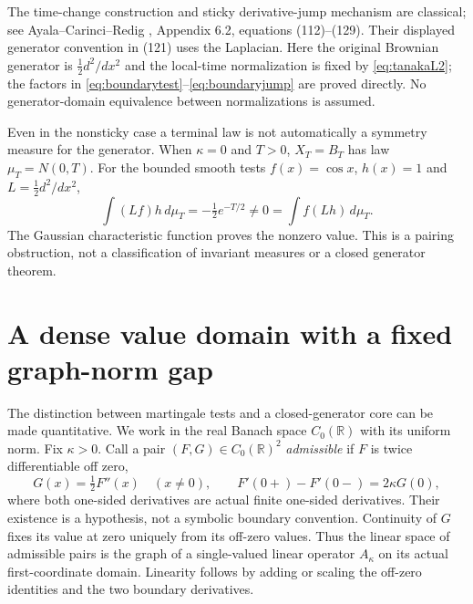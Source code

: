 \documentclass[11pt]{article}
\newcommand{\R}{\mathbb R}
\begin{document}
The time-change construction and sticky derivative-jump mechanism
are classical; see Ayala--Carinci--Redig \cite{ACR}, Appendix 6.2,
equations (112)--(129). Their displayed generator convention in
(121) uses the Laplacian. Here the original Brownian generator is
$\tfrac12d^2/dx^2$ and the local-time normalization is fixed by
\eqref{eq:tanakaL2}; the factors in \eqref{eq:boundarytest}--\eqref{eq:boundaryjump}
are proved directly. No generator-domain equivalence between
normalizations is assumed.

Even in the nonsticky case a terminal law is not automatically a
symmetry measure for the generator. When $\kappa=0$ and $T>0$,
$X_T=B_T$ has law $\mu_T=N(0,T)$. For the bounded smooth tests
$f(x)=\cos x$, $h(x)=1$ and $L=\tfrac12d^2/dx^2$,
\[
 \int (Lf)h\,d\mu_T=-\tfrac12e^{-T/2}\ne0
       =\int f(Lh)\,d\mu_T.
\]
The Gaussian characteristic function proves the nonzero value.
This is a pairing obstruction, not a classification of invariant
measures or a closed generator theorem.


\section{A dense value domain with a fixed graph-norm gap}\label{sec:graphgap}
The distinction between martingale tests and a closed-generator core can
be made quantitative. We work in the real Banach space $C_0(\R)$ with
its uniform norm. Fix $\kappa>0$. Call a pair $(F,G)\in C_0(\R)^2$
\emph{admissible} if $F$ is twice differentiable off zero,
\begin{equation}\label{eq:stickyrelation}
 G(x)=\tfrac12F''(x)\quad(x\ne0),\qquad
 F'(0+)-F'(0-)=2\kappa G(0),
\end{equation}
where both one-sided derivatives are actual finite one-sided derivatives.
Their existence is a hypothesis, not a symbolic boundary convention.
Continuity of $G$ fixes its value at zero uniquely from its off-zero
values. Thus the linear space of admissible pairs is the graph of a
single-valued linear operator $A_\kappa$ on its actual first-coordinate
domain. Linearity follows by adding or scaling the off-zero identities
and the two boundary derivatives.
\end{document}
